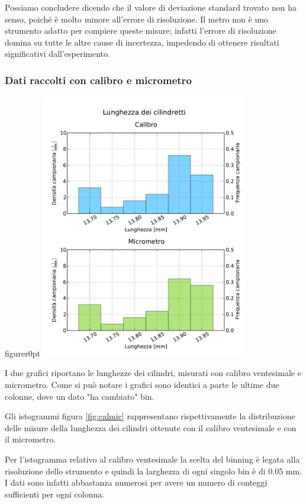 Possiamo concludere dicendo che il valore di deviazione standard trovato non ha
senso, poiché è molto minore all'errore di risoluzione. Il metro non è
uno strumento adatto per compiere queste misure; infatti l'errore di risoluzione domina su
tutte le altre cause di incertezza, impedendo di ottenere risultati significativi
dall'esperimento.

\subsubsection{Dati raccolti con calibro e micrometro}

\begin{wrapfloat}{figure}{r}{0pt}
	\centering
	\includegraphics[width=90mm]{grafici/Cilindretti_calibro_micrometro.pdf}
	\caption{I due grafici riportano le lunghezze dei cilindri, misurati con calibro
        ventesimale e micrometro. Come si può notare i grafici sono identici a parte
        le ultime due colonne, dove un dato "ha cambiato" bin.}
	\label{fig:calmic}
\end{wrapfloat}

Gli istogrammi figura \ref{fig:calmic} rappresentano rispettivamente la distribuzione delle
misure della lunghezza dei cilindri ottenute con il calibro ventesimale e con
il micrometro.

Per l'istogramma relativo al calibro ventesimale la scelta del binning è legata
alla risoluzione dello strumento e quindi la larghezza di ogni singolo
bin è di 0.05 mm. I dati sono infatti abbastanza numerosi per avere un numero
di conteggi sufficienti per ogni colonna.

